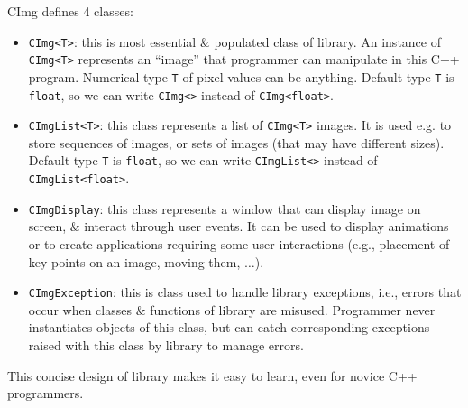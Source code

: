 \documentclass{article}
\begin{document}
\begin{itemize}
\begin{itemize}
\begin{itemize}
         \end{itemize}
         CImg defines 4 classes:
         \begin{itemize}
             \item {\tt CImg<T>}: this is most essential \& populated class of library. An instance of {\tt CImg<T>} represents an ``image'' that programmer can manipulate in this C++ program. Numerical type {\tt T} of pixel values can be anything. Default type {\tt T} is {\tt float}, so we can write {\tt CImg<>} instead of {\tt CImg<float>}.
             \item {\tt CImgList<T>}: this class represents a list of {\tt CImg<T>} images. It is used e.g. to store sequences of images, or sets of images (that may have different sizes). Default type {\tt T} is {\tt float}, so we can write {\tt CImgList<>} instead of {\tt CImgList<float>}.
             \item {\tt CImgDisplay}: this class represents a window that can display image on screen, \& interact through user events. It can be used to display animations or to create applications requiring some user interactions (e.g., placement of key points on an image, moving them, $\ldots$).
             \item {\tt CImgException}: this is class used to handle library exceptions, i.e., errors that occur when classes \& functions of library are misused. Programmer never instantiates objects of this class, but can catch corresponding exceptions raised with this class by library to manage errors.
         \end{itemize}
         This concise design of library makes it easy to learn, even for novice C++ programmers.
         

\end{itemize}
\end{itemize}
\end{document}
